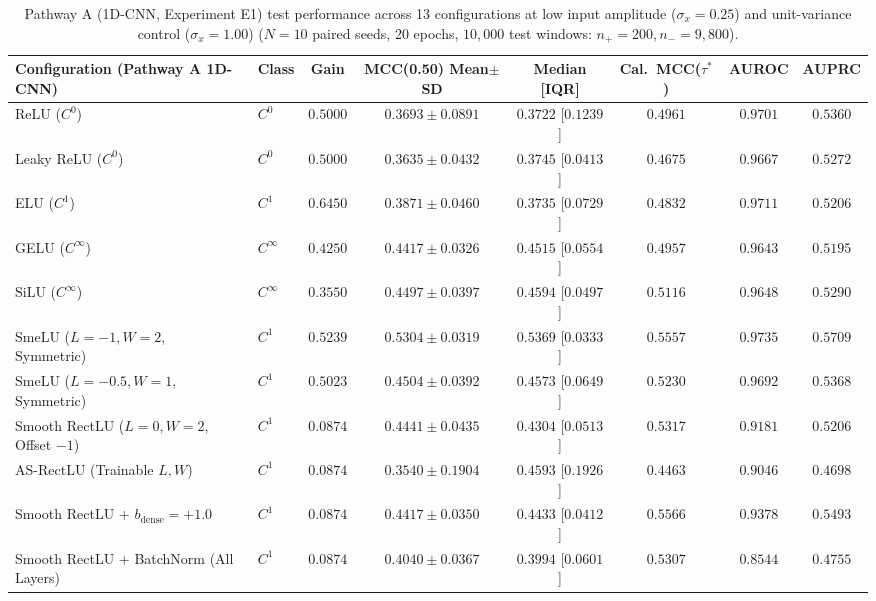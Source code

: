 \documentclass[10pt,a4paper]{article}
\begin{document}
\begin{table}[t]
\centering
\caption{Pathway A (1D-CNN, Experiment E1) test performance across 13 configurations at low input amplitude ($\sigma_x=0.25$) and unit-variance control ($\sigma_x=1.00$) ($N=10$ paired seeds, 20 epochs, $10,000$ test windows: $n_+=200, n_-=9,800$).}
\label{tab:pathA}
\footnotesize
\setlength{\tabcolsep}{4.8pt}
\renewcommand{\arraystretch}{1.05}
\begin{tabular}{llcccccc}
\toprule
\textbf{Configuration (Pathway A 1D-CNN)} & \textbf{Class} & \textbf{Gain} & \textbf{MCC(0.50) Mean$\pm$SD} & \textbf{Median [IQR]} & \textbf{Cal.\ MCC($\tau^*$)} & \textbf{AUROC} & \textbf{AUPRC} \\
\midrule
ReLU ($C^0$) & $C^0$ & $0.5000$ & $0.3693 \pm 0.0891$ & $0.3722$ [$0.1239$] & $0.4961$ & $0.9701$ & $0.5360$ \\
Leaky ReLU ($C^0$) & $C^0$ & $0.5000$ & $0.3635 \pm 0.0432$ & $0.3745$ [$0.0413$] & $0.4675$ & $0.9667$ & $0.5272$ \\
ELU ($C^1$) & $C^1$ & $0.6450$ & $0.3871 \pm 0.0460$ & $0.3735$ [$0.0729$] & $0.4832$ & $0.9711$ & $0.5206$ \\
GELU ($C^\infty$) & $C^\infty$ & $0.4250$ & $0.4417 \pm 0.0326$ & $0.4515$ [$0.0554$] & $0.4957$ & $0.9643$ & $0.5195$ \\
SiLU ($C^\infty$) & $C^\infty$ & $0.3550$ & $0.4497 \pm 0.0397$ & $0.4594$ [$0.0497$] & $0.5116$ & $0.9648$ & $0.5290$ \\
SmeLU ($L=-1, W=2$, Symmetric)~\cite{shamir2020} & $C^1$ & $0.5239$ & $\mathbf{0.5304 \pm 0.0319}$ & $\mathbf{0.5369}$ [$0.0333$] & $0.5557$ & $\mathbf{0.9735}$ & $\mathbf{0.5709}$ \\
SmeLU ($L=-0.5, W=1$, Symmetric)~\cite{shamir2020} & $C^1$ & $0.5023$ & $0.4504 \pm 0.0392$ & $0.4573$ [$0.0649$] & $0.5230$ & $0.9692$ & $0.5368$ \\
Smooth RectLU ($L=0, W=2$, Offset $-1$) & $C^1$ & $0.0874$ & $0.4441 \pm 0.0435$ & $0.4304$ [$0.0513$] & $0.5317$ & $0.9181$ & $0.5206$ \\
AS-RectLU (Trainable $L, W$) & $C^1$ & $0.0874$ & $0.3540 \pm 0.1904$ & $0.4593$ [$0.1926$] & $0.4463$ & $0.9046$ & $0.4698$ \\
Smooth RectLU + $b_{\text{dense}} = +1.0$ & $C^1$ & $0.0874$ & $0.4417 \pm 0.0350$ & $0.4433$ [$0.0412$] & $\mathbf{0.5566}$ & $0.9378$ & $0.5493$ \\
Smooth RectLU + BatchNorm (All Layers) & $C^1$ & $0.0874$ & $0.4040 \pm 0.0367$ & $0.3994$ [$0.0601$] & $0.5307$ & $0.8544$ & $0.4755$ \\

\end{tabular}
\end{table}
\end{document}
